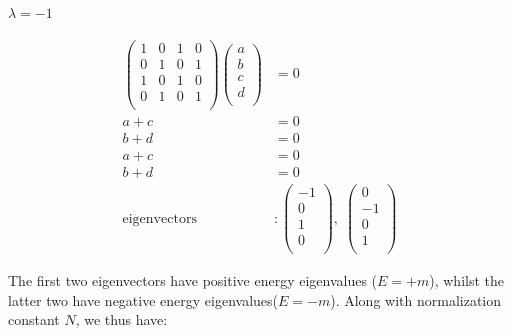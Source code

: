 \documentclass[11pt]{article}
\theoremstyle{definition}
\begin{document}
\underline{$\lambda=-1$}

\begin{align}
    \begin{pmatrix}
        1 & 0 & 1 & 0\\
        0 & 1 & 0 & 1\\
        1 & 0 & 1 & 0\\
        0 & 1 & 0 & 1\\
    \end{pmatrix} 
    \begin{pmatrix}
        a\\
        b\\
        c\\
        d\\
    \end{pmatrix}
    &= 0\\
    a + c &= 0\\
    b + d &= 0\\
    a + c &= 0\\
    b + d &= 0\\
    \text{eigenvectors} &:
    \begin{pmatrix}
        -1\\
        0\\
        1\\
        0\\
    \end{pmatrix},\;
    \begin{pmatrix}
        0\\
        -1\\
        0\\
        1\\
    \end{pmatrix}
\end{align}

The first two eigenvectors have positive energy eigenvalues ($E=+m$), whilst the latter two have negative energy eigenvalues($E=-m$). Along with normalization constant $N$, we thus have:
\end{document}
